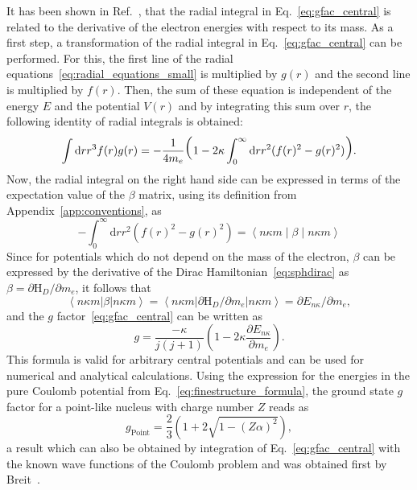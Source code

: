 It has been shown in Ref.~\cite{Karshenboim2005}, that the radial integral in Eq.~\eqref{eq:gfac_central} is related to the derivative of the electron energies with respect to its mass. As a first step, a transformation of the radial integral in Eq.~\eqref{eq:gfac_central} can be performed. For this, the first line of the radial equations~\eqref{eq:radial_equations_small} is multiplied by $g(r)$ and the second line is multiplied by $f(r)$. Then, the sum of these equation is independent of the energy $E$ and the potential $V(r)$ and by integrating this sum over $r$, the following identity of radial integrals is obtained:
\begin{equation}
\int\mathrm{d}r r^3 f(r)g(r) = -\frac{1}{4m_e}
\text{\huge(}1-2\kappa \int_0^\infty\mathrm{d}r r^2 (f(r)^2-g(r)^2)\text{\huge)}.
\end{equation}
Now, the radial integral on the right hand side can be expressed in terms of the expectation value of the $\beta$ matrix, using its definition from Appendix~\ref{app:conventions}, as
\begin{equation}
-\int_0^\infty\mathrm{d}r r^2 (f(r)^2-g(r)^2)=\left<n\kappa m\middle|\beta\middle|n\kappa m\right>
\end{equation}
Since for potentials which do not depend on the mass of the electron, $\beta$ can be expressed by the derivative of the Dirac Hamiltonian~\eqref{eq:sphdirac} as $\beta = \partial\text{H}_D/\partial m_e$, it follows that
\begin{equation}
\left<n\kappa m\right|\beta\left|n\kappa m\right> = \left<n\kappa m\right|\partial\text{H}_D/\partial m_e\left|n\kappa m\right> = \partial E_{n\kappa}/\partial m_e,
\end{equation}
and the $g$ factor~\eqref{eq:gfac_central} can be written as
\begin{equation}
g = \frac{-\kappa}{j(j+1)}\left( 1-2\kappa\frac{\partial E_{n\kappa}}{\partial m_e}\right).
\label{eq:gfac_viaDeriv}
\end{equation}
This formula is valid for arbitrary central potentials and can be used for numerical and analytical calculations. Using the expression for the energies in the pure Coulomb potential from Eq.~\eqref{eq:finestructure_formula}, the ground state $g$ factor for a point-like nucleus with charge number $Z$ reads as
\begin{equation}
\label{eq:point_gfac}
g_{\text{Point}}=\frac{2}{3}\left( 1+2\sqrt{1-(Z\alpha)^2}\right),
\end{equation}
a result which can also be obtained by integration of Eq.~\eqref{eq:gfac_central} with the known wave functions of the Coulomb problem and was obtained first by Breit~\cite{breit1928}.

